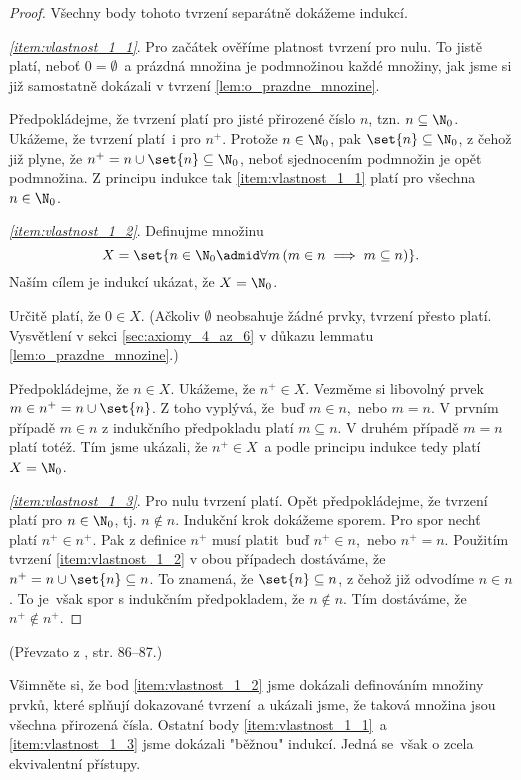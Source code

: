 \begin{proof}
    Všechny body tohoto tvrzení separátně dokážeme indukcí.\par
    \textit{\ref{item:vlastnost_1_1}}. Pro začátek ověříme platnost tvrzení pro nulu. To jistě platí, neboť $0=\emptyset$~a prázdná množina je podmnožinou každé množiny, jak jsme si již samostatně dokázali v tvrzení \ref{lem:o_prazdne_mnozine}.\par
    Předpokládejme, že tvrzení platí pro jisté přirozené číslo $n$, tzn. $n\subseteq\N_0$. Ukážeme, že tvrzení platí~i pro $n^+$. Protože $n\in\N_0$, pak $\set{n}\subseteq\N_0$, z čehož již plyne, že $n^+=n\cup\set{n}\subseteq\N_0$, neboť sjednocením podmnožin je opět podmnožina. Z principu indukce tak \ref{item:vlastnost_1_1} platí pro všechna $n\in\N_0$.\par
    \textit{\ref{item:vlastnost_1_2}}. Definujme množinu
    \begin{equation*}
        X=\set{n\in\N_0\admid \forall m\,(m\in n\implies m\subseteq n)}.
    \end{equation*} 
    Naším cílem je indukcí ukázat, že $X=\N_0$.\par
    Určitě platí, že $0\in X$. (Ačkoliv $\emptyset$ neobsahuje žádné prvky, tvrzení přesto platí. Vysvětlení v sekci \ref{sec:axiomy_4_az_6} v důkazu lemmatu \ref{lem:o_prazdne_mnozine}.)\par
    Předpokládejme, že $n\in X$. Ukážeme, že $n^+\in X$. Vezměme si libovolný prvek $m\in n^+=n\cup\set{n}$. Z toho vyplývá, že~buď $m\in n$,~nebo $m=n$. V prvním případě $m\in n$ z indukčního předpokladu platí $m\subseteq n$. V druhém případě $m=n$ platí totéž. Tím jsme ukázali, že $n^+\in X$~a podle principu indukce tedy platí $X=\N_0$.\par
    \textit{\ref{item:vlastnost_1_3}}. Pro nulu tvrzení platí. Opět předpokládejme, že tvrzení platí pro $n\in\N_0$, tj. $n\notin n$. Indukční krok dokážeme sporem. Pro spor nechť platí $n^+\in n^+$. Pak z definice $n^+$ musí platit~buď $n^+\in n$,~nebo $n^+=n$. Použitím tvrzení \ref{item:vlastnost_1_2} v obou případech dostáváme, že $n^+=n\cup\set{n}\subseteq n$. To znamená, že $\set{n}\subseteq n$, z čehož již odvodíme $n\in n$. To je~však spor s indukčním předpokladem, že $n\notin n$. Tím dostáváme, že $n^+\notin n^+$.
\end{proof}
(Převzato z \cite{BalcarStepanek1986}, str. 86--87.)\par
Všimněte si, že bod \ref{item:vlastnost_1_2} jsme dokázali definováním množiny prvků, které splňují dokazované tvrzení~a ukázali jsme, že taková množina jsou všechna přirozená čísla. Ostatní body \ref{item:vlastnost_1_1}~a \ref{item:vlastnost_1_3} jsme dokázali "běžnou" indukcí. Jedná se~však o zcela ekvivalentní přístupy.
\medskip

